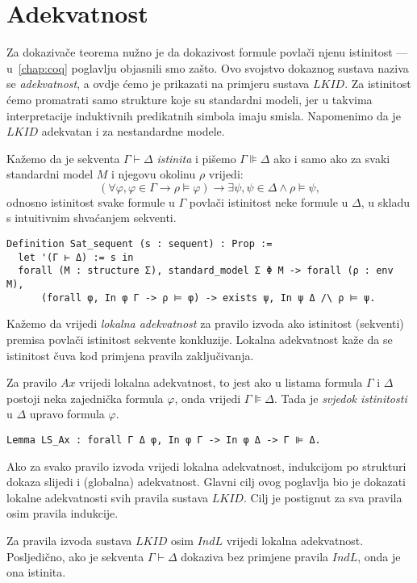\section{Adekvatnost}\label{sec:adekvatnost}
Za dokazivače teorema nužno je da dokazivost formule povlači njenu istinitost ---
u~\ref{chap:coq} poglavlju objasnili smo zašto.
Ovo svojstvo dokaznog sustava naziva se \textit{adekvatnost},
a ovdje ćemo je prikazati na primjeru sustava \(\mathit{LKID}\).
Za istinitost ćemo promatrati samo strukture koje su standardni modeli,
jer u takvima interpretacije induktivnih predikatnih simbola imaju smisla.
Napomenimo da je \(\mathit{LKID}\) adekvatan i za nestandardne modele.

\begin{definition}
  Kažemo da je sekventa \(\Gamma \vdash \Delta\) \textit{istinita} i pišemo \(\Gamma \VDash \Delta\) ako i samo ako
  za svaki standardni model \(M\) i njegovu okolinu \(\rho\) vrijedi:
  \[
    (\forall \varphi, \varphi \in \Gamma \rightarrow \rho \vDash \varphi) \rightarrow \exists \psi, \psi \in \Delta \land \rho \vDash \psi,
  \]
  \noindent odnosno istinitost svake formule u \(\Gamma\) povlači istinitost neke formule u \(\Delta\),
  u skladu s intuitivnim shvaćanjem sekventi.
\begin{verbatim}
Definition Sat_sequent (s : sequent) : Prop :=
  let '(Γ ⊢ Δ) := s in            
  forall (M : structure Σ), standard_model Σ Φ M -> forall (ρ : env M),
      (forall φ, In φ Γ -> ρ ⊨ φ) -> exists ψ, In ψ Δ /\ ρ ⊨ ψ.
\end{verbatim}
\end{definition}

Kažemo da vrijedi \textit{lokalna adekvatnost} za pravilo izvoda
ako istinitost (sekventi) premisa povlači istinitost sekvente konkluzije.
Lokalna adekvatnost kaže da se istinitost čuva kod primjena pravila zaključivanja.

\begin{example}
  Za pravilo \(\mathit{Ax}\) vrijedi lokalna adekvatnost,
  to jest ako u listama formula \(\Gamma\) i \(\Delta\) postoji neka zajednička formula \(\varphi\),
  onda vrijedi \(\Gamma \VDash \Delta\). Tada je \textit{svjedok istinitosti} u \(\Delta\) upravo formula \(\varphi\).
\begin{verbatim}
Lemma LS_Ax : forall Γ Δ φ, In φ Γ -> In φ Δ -> Γ ⊫ Δ.
\end{verbatim}
\end{example}

Ako za svako pravilo izvoda vrijedi lokalna adekvatnost,
indukcijom po strukturi dokaza slijedi i (globalna) adekvatnost.
Glavni cilj ovog poglavlja bio je dokazati lokalne adekvatnosti svih pravila sustava \(\mathit{LKID}\).
Cilj je postignut za sva pravila osim pravila indukcije.

\begin{theorem}
  Za pravila izvoda sustava \(\mathit{LKID}\) osim \(\mathit{IndL}\) vrijedi lokalna adekvatnost.
  Posljedično, ako je sekventa \(\Gamma \vdash \Delta\) dokaziva bez primjene pravila \(\mathit{IndL}\), onda je ona istinita.
\end{theorem}

